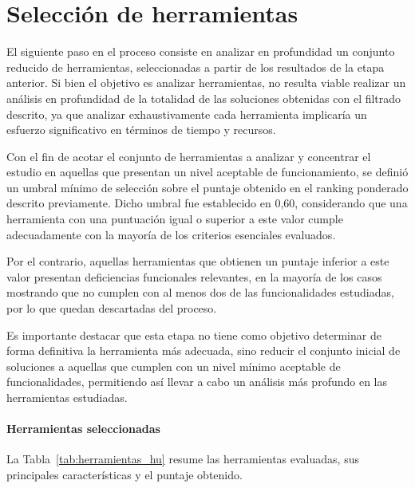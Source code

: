 \section{Selección de herramientas}
El siguiente paso en el proceso consiste en analizar en profundidad un conjunto reducido de herramientas, seleccionadas a partir de los resultados de la etapa anterior. Si bien el objetivo es analizar herramientas, no resulta viable realizar un análisis en profundidad de la totalidad de las soluciones obtenidas con el filtrado descrito, ya que analizar exhaustivamente cada herramienta implicaría un esfuerzo significativo en términos de tiempo y recursos.

Con el fin de acotar el conjunto de herramientas a analizar y concentrar el estudio en aquellas que presentan un nivel aceptable de funcionamiento, se definió un umbral mínimo de selección sobre el puntaje obtenido en el ranking ponderado descrito previamente. Dicho umbral fue establecido en 0,60, considerando que una herramienta con una puntuación igual o superior a este valor cumple adecuadamente con la mayoría de los criterios esenciales evaluados.

Por el contrario, aquellas herramientas que obtienen un puntaje inferior a este valor presentan deficiencias funcionales relevantes, en la mayoría de los casos mostrando que no cumplen con al menos dos de las funcionalidades estudiadas, por lo que quedan descartadas del proceso.

Es importante destacar que esta etapa no tiene como objetivo determinar de forma definitiva la herramienta más adecuada, sino reducir el conjunto inicial de soluciones a aquellas que cumplen con un nivel mínimo aceptable de funcionalidades, permitiendo así llevar a cabo un análisis más profundo en las herramientas estudiadas.

\paragraph{Herramientas seleccionadas}
La Tabla~\ref{tab:herramientas_hu} resume las herramientas evaluadas, sus principales características y el puntaje obtenido.

